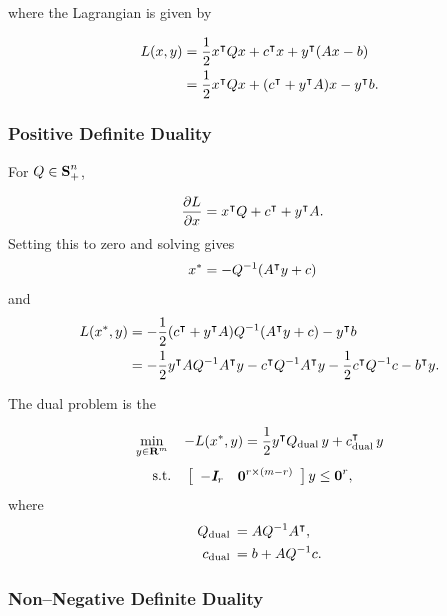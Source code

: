 \documentclass{article}
\begin{document}
    where the Lagrangian is given by

    \begin{align*}
        L(x,y) &= \frac{1}{2} x^\intercal Q x+c^\intercal x
        + y^\intercal (A x - b)\\
        &= \frac{1}{2} x^\intercal Q x+(c^\intercal +y^\intercal A )x -y^\intercal b.
    \end{align*}

\subsubsection{Positive Definite Duality}

    For $Q\in\textbf{S}_+^n$,

        \begin{align*}
        \frac{\partial L}{\partial x}&=x^\intercal Q+  
        c^\intercal+y^\intercal A.
    \end{align*}
    Setting this to zero and solving gives
    \begin{align}
        x^*&=-Q^{-1}(A^\intercal y+c)
    \end{align}
    and
    \begin{align*}
        L(x^*,y) &= 
        -\frac{1}{2}(c^\intercal +y^\intercal A )Q^{-1}(A^\intercal y+c) 
        -y^\intercal b\\
        &=
        - \frac{1}{2} y^\intercal A Q^{-1} A^\intercal y
        -
        c^\intercal Q^{-1} A^\intercal y
        - \frac{1}{2} c^\intercal Q^{-1}c
        -
        b^\intercal y.
    \end{align*}

    The dual problem is the \QP

    \begin{align}
        \min_{y\in\textbf{R}^m}\quad -L(x^*,y)=\frac{1}{2} y^\intercal Q_{\text{dual}\:} y + c_{\text{dual}\:}^\intercal y
    \end{align}
    \begin{align*}
        \text{s.t.}\quad  \left[\begin{array}{lllllllllllllllllll}-\emph{\textbf{I}}_{r}&\textbf{0}^{{r}\times (m-{r})}\end{array}\right]y&\leq \textbf{0}^{r},
    \end{align*}
    where
    \begin{align*}
        Q_{\text{dual}\:}&=A Q^{-1} A^\intercal,\\
        c_{\text{dual}\:}&=b+A Q^{-1} c.
    \end{align*}


\subsubsection{Non--Negative Definite Duality}
\end{document}

